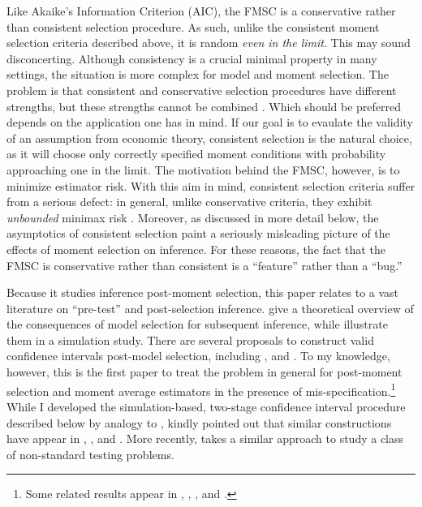 Like Akaike's Information Criterion (AIC), the FMSC is a conservative rather than consistent selection procedure.
As such, unlike the consistent moment selection criteria described above, it is random \emph{even in the limit}.
This may sound disconcerting.
Although consistency is a crucial minimal property in many settings, the situation is more complex for model and moment selection.
The problem is that consistent and conservative selection procedures have different strengths, but these strengths cannot be combined \cite{Yang2005}.
Which should be preferred depends on the application one has in mind.
If our goal is to evaulate the validity of an assumption from economic theory, consistent selection is the natural choice, as it will choose only correctly specified moment conditions with probability approaching one in the limit.
The motivation behind the FMSC, however, is to minimize estimator risk.
With this aim in mind, consistent selection criteria suffer from a serious defect: in general, unlike conservative criteria, they exhibit \emph{unbounded} minimax risk \citep{LeebPoetscher2008}.
Moreover, as discussed in more detail below, the asymptotics of consistent selection paint a seriously misleading picture of the effects of moment selection on inference.
For these reasons, the fact that the FMSC is conservative rather than consistent is a ``feature'' rather than a ``bug.''

Because it studies inference post-moment selection, this paper relates to a vast literature on ``pre-test'' and post-selection inference.
\citet{LeebPoetscher2005, LeebPoetscher2009} give a theoretical overview of the consequences of model selection for subsequent inference, while \cite{Demetrescu} illustrate them in a simulation study. 
There are several proposals to construct valid confidence intervals post-model selection, including \cite{Kabaila1998}, \cite{HjortClaeskens} and \cite{KabailaLeeb2006}. 
To my knowledge, however, this is the first paper to treat the problem in general for post-moment selection and moment average estimators in the presence of mis-specification.\footnote{Some related results appear in \cite{Berkowitz}, \cite{Guggenberger2010}, \cite{Guggenberger2012}, and \cite{GuggenbergerKumar}.}
While I developed the simulation-based, two-stage confidence interval procedure described below by analogy to \cite{ClaeskensHjortbook}, \cite{Leeb} kindly pointed out that similar constructions have appear in \cite{Loh1985}, \cite{Berger1994}, and \cite{Silvapulle1996}. More recently, \cite{McCloskey} takes a similar approach to study a class of non-standard testing problems.

